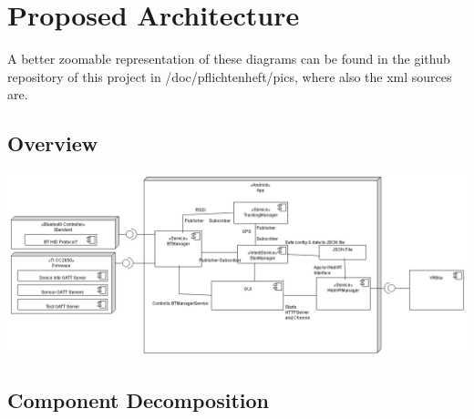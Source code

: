 \section{Proposed Architecture}
A better zoomable representation of these diagrams can be found in the github repository of this project in /doc/pflichtenheft/pics, where also the xml sources are.
\subsection{Overview}

\includegraphics[scale=0.35]{pics/composite_app.png}

\subsection{Component Decomposition}

